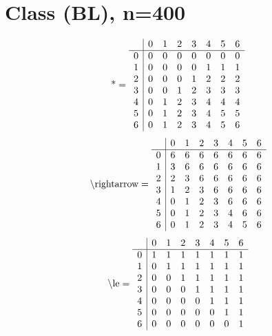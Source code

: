 \documentclass[11pt]{article}
\begin{document}
\section{Class (BL), n=400}
\[\text{*} = 
\begin{array}{r | r r r r r r r}
 & 0 & 1 & 2 & 3 & 4 & 5 & 6 \\ \hline
0 & 0 & 0 & 0 & 0 & 0 & 0 & 0 \\
1 & 0 & 0 & 0 & 0 & 1 & 1 & 1 \\
2 & 0 & 0 & 0 & 1 & 2 & 2 & 2 \\
3 & 0 & 0 & 1 & 2 & 3 & 3 & 3 \\
4 & 0 & 1 & 2 & 3 & 4 & 4 & 4 \\
5 & 0 & 1 & 2 & 3 & 4 & 5 & 5 \\
6 & 0 & 1 & 2 & 3 & 4 & 5 & 6 \\
\end{array}
\]
\[\text{\textbackslash rightarrow} = 
\begin{array}{r | r r r r r r r}
 & 0 & 1 & 2 & 3 & 4 & 5 & 6 \\ \hline
0 & 6 & 6 & 6 & 6 & 6 & 6 & 6 \\
1 & 3 & 6 & 6 & 6 & 6 & 6 & 6 \\
2 & 2 & 3 & 6 & 6 & 6 & 6 & 6 \\
3 & 1 & 2 & 3 & 6 & 6 & 6 & 6 \\
4 & 0 & 1 & 2 & 3 & 6 & 6 & 6 \\
5 & 0 & 1 & 2 & 3 & 4 & 6 & 6 \\
6 & 0 & 1 & 2 & 3 & 4 & 5 & 6 \\
\end{array}
\]
\[\text{\textbackslash le} = 
\begin{array}{r | r r r r r r r}
 & 0 & 1 & 2 & 3 & 4 & 5 & 6 \\ \hline
0 & 1 & 1 & 1 & 1 & 1 & 1 & 1 \\
1 & 0 & 1 & 1 & 1 & 1 & 1 & 1 \\
2 & 0 & 0 & 1 & 1 & 1 & 1 & 1 \\
3 & 0 & 0 & 0 & 1 & 1 & 1 & 1 \\
4 & 0 & 0 & 0 & 0 & 1 & 1 & 1 \\
5 & 0 & 0 & 0 & 0 & 0 & 1 & 1 \\
6 & 0 & 0 & 0 & 0 & 0 & 0 & 1 \\
\end{array}
\]
\end{document}
